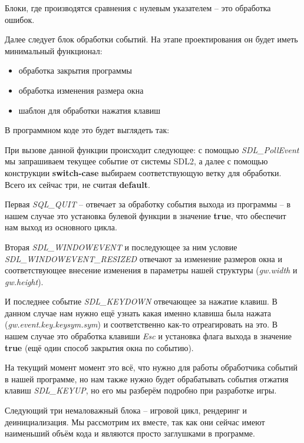 Блоки, где производятся сравнения с нулевым указателем -- это обработка ошибок.

Далее следует блок обработки событий. На этапе проектирования он будет иметь минимальный функционал:
\begin{itemize}
    \item обработка закрытия программы
    \item обработка изменения размера окна
    \item шаблон для обработки нажатия клавиш
\end{itemize}

В программном коде это будет выглядеть так:


При вызове данной функции происходит следующее: с помощью \emph{SDL\_PollEvent} мы запрашиваем текущее 
событие от системы SDL2, а далее с помощью конструкции \textbf{switch-case} выбираем соответствующую 
ветку для обработки. Всего их сейчас три, не считая \textbf{default}. 

Первая \emph{SQL\_QUIT} -- отвечает за обработку события выхода из программы -- в нашем случае это 
установка булевой функции в значение \textbf{true}, что обеспечит нам выход из основного цикла.

Вторая \emph{SDL\_WINDOWEVENT} и последующее за ним условие \emph{SDL\_WINDOWEVENT\_RESIZED} отвечают 
за изменение размеров окна и соответствующее внесение изменения в параметры нашей структуры 
(\emph{gw.width} и \emph{gw.height}).

И последнее событие \emph{SDL\_KEYDOWN} отвечающее за нажатие клавиш. В данном случае нам нужно 
ещё узнать какая именно клавиша была нажата (\emph{gw.event.key.keysym.sym}) и соответственно 
как-то отреагировать на это. В нашем случае это обработка клавиши \emph{Esc} и установка флага 
выхода в значение \textbf{true} (ещё один способ закрытия окна по событию).

На текущий момент момент это всё, что нужно для работы обработчика событий в нашей программе, но нам 
также нужно будет обрабатывать события отжатия клавиш \emph{SDL\_KEYUP}, но его мы разберём подробно 
при разработке игры.

Следующий три немаловажный блока -- игровой цикл, рендеринг и деинициализация. Мы рассмотрим их 
вместе, так как они сейчас имеют наименьший объём кода и являются просто заглушками в программе.


